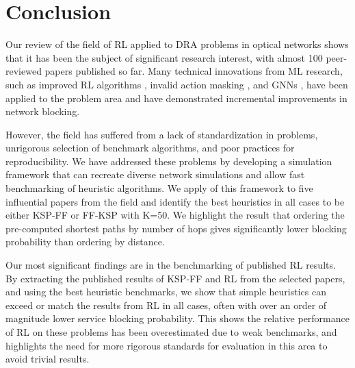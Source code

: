 \section{Conclusion}
\label{sec:conclusion}


Our review of the field of RL applied to DRA problems in optical networks shows that it has been the subject of significant research interest, with almost 100 peer-reviewed papers published so far. Many technical innovations from ML research, such as improved RL algorithms \cite{mnih_asynchronous_2016}, invalid action masking \cite{shimoda_mask_2021,nevin_techniques_2022,cheng_ptrnet-rsa_2024}, and GNNs \cite{xu_deep_2022,li_gnn-based_2022,xiong_graph_2024}, have been applied to the problem area and have demonstrated incremental improvements in network blocking.

However, the field has suffered from a lack of standardization in problems, unrigorous selection of benchmark algorithms, and poor practices for reproducibility. We have addressed these problems by developing a simulation framework that can recreate diverse network simulations and allow fast benchmarking of heuristic algorithms. We apply of this framework to five influential papers from the field and identify the best heuristics in all cases to be either KSP-FF or FF-KSP with K=50. We highlight the result that ordering the pre-computed shortest paths by number of hops gives significantly lower blocking probability than ordering by distance. %

Our most significant findings are in the benchmarking of published RL results. By extracting the published results of KSP-FF and RL from the selected papers, and using the best heuristic benchmarks, we show that simple heuristics can exceed or match the results from RL in all cases, often with over an order of magnitude lower service blocking probability. This shows the relative performance of RL on these problems has been overestimated due to weak benchmarks, and highlights the need for more rigorous standards for evaluation in this area to avoid trivial results.

